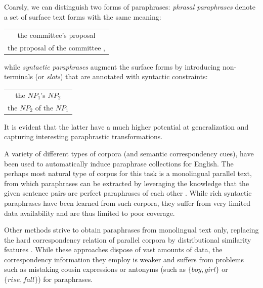 \documentclass[11pt]{article}
\begin{document}
Coarsly, we can distinguish two forms of paraphrases: \emph{phrasal
  paraphrases} denote a set of surface text forms with the same
meaning:
\begin{center}
\begin{tabular}{c}
the committee's proposal \\
the proposal of the committee ,
\end{tabular}
\end{center}
while \emph{syntactic paraphrases} augment the surface forms by
introducing non-terminals (or \emph{slots}) that are annotated with
syntactic constraints:
\begin{center}
\begin{tabular}{c}
the $\mathit{NP}_1$'s $\mathit{NP}_2$ \\
the $\mathit{NP}_2$ of the $\mathit{NP}_1$
\end{tabular}
\end{center}
It is evident that the latter have a much higher potential at
generalization and capturing interesting paraphrastic transformations.

A variety of different types of corpora (and semantic correspondency
cues), have been used to automatically induce paraphrase collections
for English. The perhaps most natural type of corpus for this task is
a monolingual parallel text, from which paraphrases can be extracted
by leveraging the knowledge that the given sentence pairs are perfect
paraphrases of each other \cite{Pang2003}. While rich syntactic
paraphrases have been learned from such corpora, they suffer from very
limited data availability and are thus limited to poor coverage.

Other methods strive to obtain paraphrases from monolingual text only,
replacing the hard correspondency relation of parallel corpora by
distributional similarity features \cite{Lin2001,Bhagat2008}. While
these approaches dispose of vast amounts of data, the correspondency
information they employ is weaker and suffers from problems such as
mistaking cousin expressions or antonyms (such as $\{\mathit{boy},
\mathit{girl}\}$ or $\{\mathit{rise}, \mathit{fall}\}$) for
paraphrases.
\end{document}
